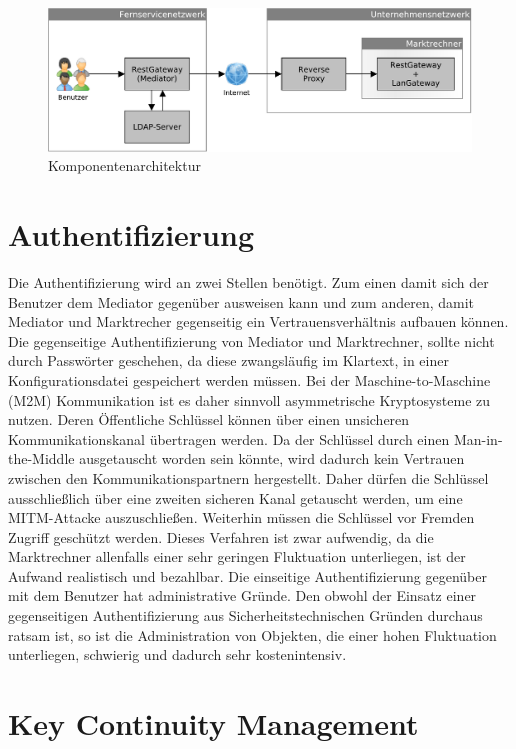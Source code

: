 \documentclass[11pt,a4paper]{report}
\begin{document}
\begin{figure}[htbp]
\centering
\includegraphics[scale=0.46]{images/design_architekture.pdf}
\caption{Komponentenarchitektur}
\label{fig:comp_arch}
\end{figure}

\section{Authentifizierung}

Die Authentifizierung wird an zwei Stellen benötigt. Zum einen damit sich der Benutzer dem Mediator gegenüber ausweisen kann und zum anderen, damit Mediator und Marktrecher gegenseitig ein Vertrauensverhältnis aufbauen können. Die gegenseitige Authentifizierung von Mediator und Marktrechner, sollte nicht durch Passwörter geschehen, da diese zwangsläufig im Klartext, in einer Konfigurationsdatei gespeichert werden müssen. Bei der Maschine-to-Maschine (M2M) Kommunikation ist es daher sinnvoll asymmetrische Kryptosysteme zu nutzen. Deren Öffentliche Schlüssel können über einen unsicheren Kommunikationskanal übertragen werden. Da der Schlüssel durch einen Man-in-the-Middle ausgetauscht worden sein könnte, wird dadurch kein Vertrauen zwischen den Kommunikationspartnern hergestellt. Daher dürfen die Schlüssel ausschließlich über eine zweiten sicheren Kanal getauscht werden, um eine MITM-Attacke auszuschließen. Weiterhin müssen die Schlüssel vor Fremden Zugriff geschützt werden. Dieses Verfahren ist zwar aufwendig, da die Marktrechner allenfalls einer sehr geringen Fluktuation unterliegen, ist der Aufwand realistisch und bezahlbar. Die einseitige Authentifizierung gegenüber mit dem Benutzer hat administrative Gründe. Den obwohl der Einsatz einer gegenseitigen Authentifizierung aus Sicherheitstechnischen Gründen durchaus ratsam ist, so ist die Administration von Objekten, die einer hohen Fluktuation unterliegen, schwierig und dadurch sehr kostenintensiv.

\section{Key Continuity Management}
\end{document}
